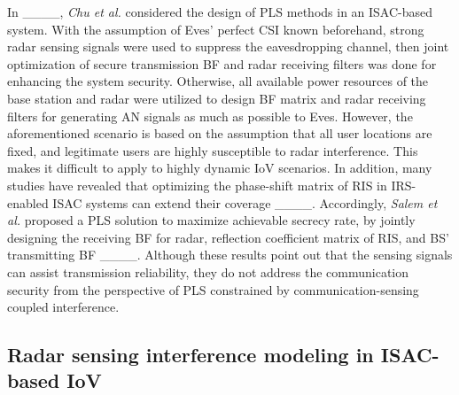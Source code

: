 In ____, \emph{ Chu et al.} considered the design of 
PLS methods in an ISAC-based system. With the assumption of Eves' perfect CSI known beforehand, strong radar sensing signals were used to suppress the eavesdropping channel, then joint optimization of secure transmission BF and radar receiving filters was done for enhancing the system security. Otherwise, 
all available power resources of the base station and radar were utilized to design BF matrix and radar receiving filters for generating AN signals as much as possible to Eves. However, the aforementioned scenario is based on the assumption that all user locations are fixed, and legitimate users are highly susceptible to radar interference. This makes it difficult to apply to highly dynamic IoV scenarios.
In addition, many studies have revealed that optimizing the phase-shift matrix of RIS in IRS-enabled ISAC systems can extend their coverage ____.
Accordingly, \emph{Salem et al.} proposed a PLS solution to maximize achievable secrecy rate,
by jointly designing the receiving BF for radar, reflection coefficient matrix of RIS, and BS' transmitting BF ____.
Although these results point out that the sensing signals can assist transmission reliability, they do not address the communication security from the perspective of PLS constrained by communication-sensing coupled interference.

\subsection{Radar sensing interference modeling in ISAC-based IoV}

\iffalse
To describe radar sensing capability, \emph{Martin et al.} introduced the concept of \emph{interruption} into radar networks, using radar interruption as a performance metric defined as the situation where a radar network cannot detect a specific object due to interference from others ____. \emph{Brooker} showed a high probability of interference in overlapping frequency bands by studying interference under different conditions and sensor types. Furthermore, they investigated mutual interference between mmWave radar systems operating in the 77 GHz and 94 GHz frequency bands ____. Researchers have developed mathematical models to gain a deeper understanding of the mutual interference between automotive radars and to predict the degree of sensing interference in different scenarios. In ____, \emph{Al-Hourani et al.} pioneered the modelling of automotive radar interference based on stochastic geometry tools. They analyzed the interference between opposing lane radars using Poisson and lattice models, and proposed to estimate the probability of success of radar ranging based on closed-form interference statistics. In ____, \emph{Fang et al.} studied radar interference in bidirectional multilane scenarios and modelled target radar cross section (RCS) fluctuations using Swerling I and Chi-Square models, obtaining closed-form expressions for radar SRP. These studies provide the foundation for the integration of communication and sensing.
\fi

